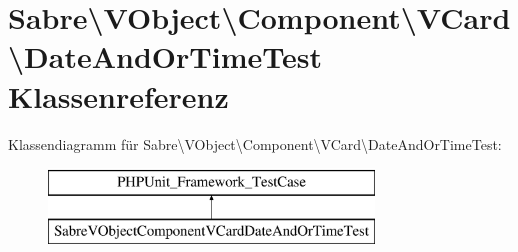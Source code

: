 \hypertarget{class_sabre_1_1_v_object_1_1_property_1_1_v_card_1_1_date_and_or_time_test}{}\section{Sabre\textbackslash{}V\+Object\textbackslash{}Component\textbackslash{}V\+Card\textbackslash{}Date\+And\+Or\+Time\+Test Klassenreferenz}
\label{class_sabre_1_1_v_object_1_1_property_1_1_v_card_1_1_date_and_or_time_test}
Klassendiagramm für Sabre\textbackslash{}V\+Object\textbackslash{}Component\textbackslash{}V\+Card\textbackslash{}Date\+And\+Or\+Time\+Test\+:\begin{figure}[H]
\begin{center}
\leavevmode
\includegraphics[height=2.000000cm]{class_sabre_1_1_v_object_1_1_property_1_1_v_card_1_1_date_and_or_time_test}
\end{center}
\end{figure}
